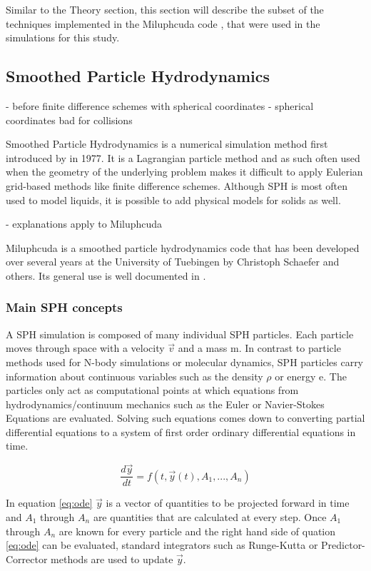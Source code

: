 Similar to the Theory section, this section will describe the subset of the techniques implemented in the Miluphcuda code \cite{Schaefer_2016}, \cite{Schaefer_2020} that were used in the simulations for this study.

\subsection{Smoothed Particle Hydrodynamics}
- before finite difference schemes with spherical coordinates
- spherical coordinates bad for collisions


Smoothed Particle Hydrodynamics is a numerical simulation method first introduced by \cite{Monaghan_1977} in 1977. It is a Lagrangian particle method and as such often used when the geometry of the underlying problem makes it difficult to apply Eulerian grid-based methods like finite difference schemes. Although SPH is most often used to model liquids, it is possible to add physical models for solids as well.

- explanations apply to Miluphcuda

Miluphcuda is a smoothed particle hydrodynamics code that has been developed over several years at the University of Tuebingen by Christoph Schaefer and others. Its general use is well documented in \cite{Schaefer_2016}.

\subsubsection{Main SPH concepts}
A SPH simulation is composed of many individual SPH particles. Each particle moves through space with a velocity $\vec{v}$ and a mass m. In contrast to particle methods used for N-body simulations or molecular dynamics, SPH particles carry information about continuous variables such as the density $\rho$ or energy e. The particles only act as computational points at which equations from hydrodynamics/continuum mechanics such as the Euler or Navier-Stokes Equations are evaluated. Solving such equations comes down to converting partial differential equations to a system of first order ordinary differential equations in time.

\begin{equation} \label{eq:ode}
    \frac{d\vec{y}}{dt} = f(t, \vec{y}(t), A_1, ..., A_n)
\end{equation}

In equation \ref{eq:ode} $\vec{y}$ is a vector of quantities to be projected forward in time and $A_1$ through $A_n$ are quantities that are calculated at every step. Once $A_1$ through $A_n$ are known for every particle and the right hand side of quation \ref{eq:ode} can be evaluated, standard integrators such as Runge-Kutta or Predictor-Corrector methods are used to update $\vec{y}$.

